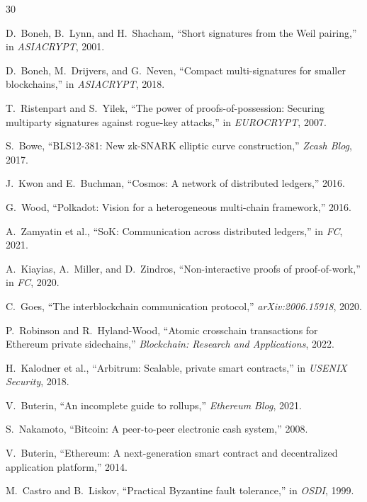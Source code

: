 
\begin{thebibliography}{30}

D.~Boneh, B.~Lynn, and H.~Shacham, ``Short signatures from the Weil pairing,'' in \emph{ASIACRYPT}, 2001.

D.~Boneh, M.~Drijvers, and G.~Neven, ``Compact multi-signatures for smaller blockchains,'' in \emph{ASIACRYPT}, 2018.

T.~Ristenpart and S.~Yilek, ``The power of proofs-of-possession: Securing multiparty signatures against rogue-key attacks,'' in \emph{EUROCRYPT}, 2007.

S.~Bowe, ``BLS12-381: New zk-SNARK elliptic curve construction,'' \emph{Zcash Blog}, 2017.

J.~Kwon and E.~Buchman, ``Cosmos: A network of distributed ledgers,'' 2016.

G.~Wood, ``Polkadot: Vision for a heterogeneous multi-chain framework,'' 2016.

A.~Zamyatin et al., ``SoK: Communication across distributed ledgers,'' in \emph{FC}, 2021.

A.~Kiayias, A.~Miller, and D.~Zindros, ``Non-interactive proofs of proof-of-work,'' in \emph{FC}, 2020.

C.~Goes, ``The interblockchain communication protocol,'' \emph{arXiv:2006.15918}, 2020.

P.~Robinson and R.~Hyland-Wood, ``Atomic crosschain transactions for Ethereum private sidechains,'' \emph{Blockchain: Research and Applications}, 2022.

H.~Kalodner et al., ``Arbitrum: Scalable, private smart contracts,'' in \emph{USENIX Security}, 2018.

V.~Buterin, ``An incomplete guide to rollups,'' \emph{Ethereum Blog}, 2021.

S.~Nakamoto, ``Bitcoin: A peer-to-peer electronic cash system,'' 2008.

V.~Buterin, ``Ethereum: A next-generation smart contract and decentralized application platform,'' 2014.

M.~Castro and B.~Liskov, ``Practical Byzantine fault tolerance,'' in \emph{OSDI}, 1999.


\end{thebibliography}
